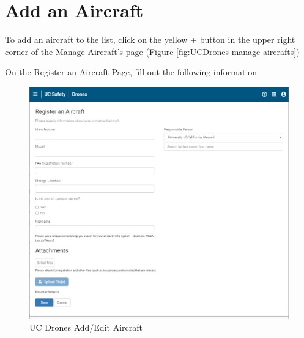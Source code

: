 \documentclass[
]{book}
\begin{document}
\hypertarget{add-an-aircraft}{%
\section{Add an Aircraft}\label{add-an-aircraft}}

To add an aircraft to the list, click on the yellow + button in the upper right corner of the Manage Aircraft's page (Figure \ref{fig:UCDrones-manage-aircrafts})

On the Register an Aircraft Page, fill out the following information

\begin{figure}

{\centering \includegraphics[width=0.95\linewidth]{images/UCDrones_aircraft} 

}

\caption{UC Drones Add/Edit Aircraft}\label{fig:UCDrones-edit-aircrafts}
\end{figure}
\end{document}
